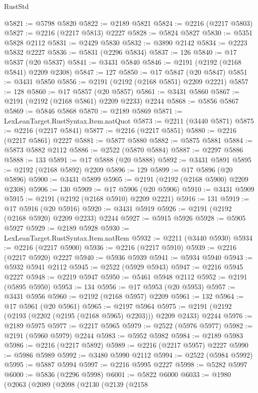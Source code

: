 \begin{lexlean}{RustStd}
\begin{coremodule}
@5821 := @5798 @5820
@5822 := @2189 @5821
@5824 := @2216 (@2217 @5803)
@5827 := @2216 (@2217 @5813) @2227
@5828 := @5824 @5827
@5830 := @5351 @5828 @2112
@5831 := @2429 @5830
@5832 := @3890 @2142
@5834 := @2223 @5832 @2227
@5836 := @5831 (@2296 @5834)
@5837 := 126
@5840 := @17 @5837 (@20 @5837)
@5841 := @3431 @5840
@5846 := @2191 (@2192 (@2168 @5841) @2209 @2308)
@5847 := 127
@5850 := @17 @5847 (@20 @5847)
@5851 := @3431 @5850
@5856 := @2191 (@2192 (@2168 @5851) @2209 @2221)
@5857 := 128
@5860 := @17 @5857 (@20 @5857)
@5861 := @3431 @5860
@5867 := @2191 (@2192 (@2168 @5861) @2209 @2233) @2244
@5868 := @5856 @5867
@5869 := @5846 @5868
@5870 := @2189 @5869
@5871 := LexLeanTarget.RustSyntax.Item.natQuot
@5873 := @2211 (@3440 @5871)
@5875 := @2216 (@2217 @5841)
@5877 := @2216 (@2217 @5851)
@5880 := @2216 (@2217 @5861) @2227
@5881 := @5877 @5880
@5882 := @5875 @5881
@5884 := @5873 @5882 @2112
@5886 := @2522 (@5870 @5884)
@5887 := @2297 @5886
@5888 := 133
@5891 := @17 @5888 (@20 @5888)
@5892 := @3431 @5891
@5895 := @2192 (@2168 @5892) @2209
@5896 := 129
@5899 := @17 @5896 (@20 @5896)
@5900 := @3431 @5899
@5905 := @2191 (@2192 (@2168 @5900) @2209 @2308)
@5906 := 130
@5909 := @17 @5906 (@20 @5906)
@5910 := @3431 @5909
@5915 := @2191 (@2192 (@2168 @5910) @2209 @2221)
@5916 := 131
@5919 := @17 @5916 (@20 @5916)
@5920 := @3431 @5919
@5926 := @2191 (@2192 (@2168 @5920) @2209 @2233) @2244
@5927 := @5915 @5926
@5928 := @5905 @5927
@5929 := @2189 @5928
@5930 := LexLeanTarget.RustSyntax.Item.natRem
@5932 := @2211 (@3440 @5930)
@5934 := @2216 (@2217 @5900)
@5936 := @2216 (@2217 @5910)
@5939 := @2216 (@2217 @5920) @2227
@5940 := @5936 @5939
@5941 := @5934 @5940
@5943 := @5932 @5941 @2112
@5945 := @2522 (@5929 @5943)
@5947 := @2216 @5945 @2227
@5948 := @2219 @5947
@5950 := @5461 @5948 @2112
@5952 := @2191 (@5895 @5950)
@5953 := 134
@5956 := @17 @5953 (@20 @5953)
@5957 := @3431 @5956
@5960 := @2192 (@2168 @5957) @2209
@5961 := 132
@5964 := @17 @5961 (@20 @5961)
@5965 := @2197 @5964
@5975 := @2191 (@2192 (@2193 (@2202 (@2195 (@2168 @5965) @2203))) @2209 @2433) @2244
@5976 := @2189 @5975
@5977 := @2217 @5965
@5979 := @2522 (@5976 @5977)
@5982 := @2191 (@5960 @5979) @2244
@5983 := @5952 @5982
@5984 := @2189 @5983
@5986 := @2216 (@2217 @5892)
@5989 := @2216 (@2217 @5957) @2227
@5990 := @5986 @5989
@5992 := @3480 @5990 @2112
@5994 := @2522 (@5984 @5992)
@5995 := @5887 @5994
@5997 := @2216 @5995 @2227
@5998 := @5282 @5997
@6000 := @5836 (@2296 @5998)
@6001 := @5822 @6000
@6033 := @1980
    (@2063
      (@2089
        (@2098
          (@2130
            (@2139
              (@2158

\end{coremodule}
\end{lexlean}

